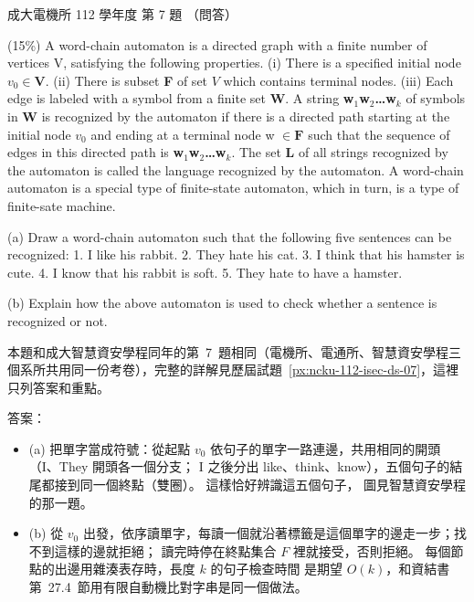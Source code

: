 \begin{pastexam}[label={px:ncku-112-ee-ds-07}]{成大電機所 112 學年度 第 7 題}
（問答）

(15\%) A word-chain automaton is a directed graph with a finite number of vertices V, satisfying the
following properties. (i) There is a specified initial node $v_0\in \boldsymbol{V}$. (ii) There is
subset \textbf{F} of set $V$ which contains terminal nodes. (iii) Each edge is labeled with a symbol
from a finite set \textbf{W}. A string \textbf{w$_1$w$_2$\ldots w$_k$} of symbols in \textbf{W} is
recognized by the automaton if there is a directed path starting at the initial node $v_0$ and
ending at a terminal node w $\in \boldsymbol{F}$ such that the sequence of edges in this directed
path is \textbf{w$_1$w$_2$\ldots w$_k$}. The set \textbf{L} of all strings recognized by the
automaton is called the language recognized by the automaton. A word-chain automaton is a special
type of finite-state automaton, which in turn, is a type of finite-sate machine.

(a) Draw a word-chain automaton such that the following five sentences can be recognized: 1. I like
his rabbit. 2. They hate his cat. 3. I think that his hamster is cute. 4. I know that his rabbit
is soft. 5. They hate to have a hamster.

(b) Explain how the above automaton is used to check whether a sentence is recognized or not.
\end{pastexam}

\begin{pastsoln}
本題和成大智慧資安學程同年的第~7~題相同（電機所、電通所、智慧資安學程三個系所共用同一份考卷），完整的詳解見歷屆試題~\ref{px:ncku-112-isec-ds-07}，這裡只列答案和重點。

答案：
\begin{itemize}
\item (a) 把單字當成符號：從起點 $v_0$ 依句子的單字一路連邊，共用相同的開頭（I、They 開頭各一個分支；
I 之後分出 like、think、know），五個句子的結尾都接到同一個終點（雙圈）。 這樣恰好辨識這五個句子，
圖見智慧資安學程的那一題。
\item (b) 從 $v_0$ 出發，依序讀單字，每讀一個就沿著標籤是這個單字的邊走一步；找不到這樣的邊就拒絕；
讀完時停在終點集合 $F$ 裡就接受，否則拒絕。 每個節點的出邊用雜湊表存時，長度 $k$ 的句子檢查時間
是期望 $O(k)$，和資結書第~27.4~節用有限自動機比對字串是同一個做法。
\end{itemize}
\end{pastsoln}
